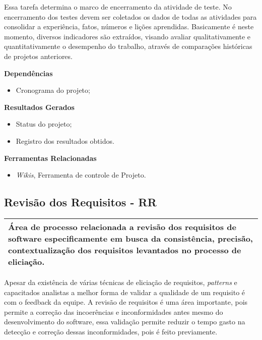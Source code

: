 Essa tarefa determina o marco de encerramento da atividade de teste. No encerramento dos testes devem ser coletados os dados de todas as atividades para consolidar a experiência, fatos, números e lições aprendidas. Basicamente é neste momento, diversos indicadores são extraídos, visando avaliar qualitativamente e quantitativamente o desempenho do trabalho, através de comparações históricas de projetos anteriores.

\textbf{Dependências}
\begin{itemize}
    \item Cronograma do projeto;
\end{itemize}

\textbf{Resultados Gerados}
\begin{itemize}
    \item Status do projeto;
    \item Registro dos resultados obtidos.
\end{itemize}

\textbf{Ferramentas Relacionadas}
\begin{itemize}
\item \textit{Wikis}, Ferramenta de controle de Projeto.
\end{itemize}

\subsection{Revisão dos Requisitos - RR}
\label{sec:revrequisitos}

\begin{table}[!ht]
\centering
\begin{tabular}{|p{130mm}|}
\hline
Área de processo relacionada a revisão dos requisitos de software especificamente em busca da consistência, precisão, contextualização dos requisitos levantados no processo de eliciação. \\ 
\hline
\end{tabular}
\end{table}

Apesar da existência de várias técnicas de eliciação de requisitos, \textit{patterns} e capacitados analistas a melhor forma de validar a qualidade de um requisito é com o feedback da equipe. A revisão de requisitos é uma área importante, pois permite a correção das incoerências e inconformidades antes mesmo do desenvolvimento do software, essa validação permite reduzir o tempo gasto na detecção e correção dessas inconformidades, pois é feito previamente.

